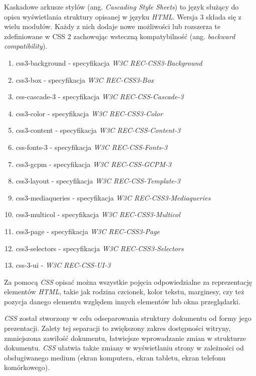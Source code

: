 \documentclass[polish, twoside, 12pt]{mwart}
\begin{document}
Kaskadowe arkusze stylów (ang. \emph{Cascading Style Sheets}) to język służący do opisu wyświetlania struktury opisanej w języku \emph{HTML}. Wersja 3 składa się z wielu modułów. Każdy z nich dodaje nowe możliwości lub rozszerza te zdefiniowane w CSS 2 zachowując wsteczną kompatybilność (ang. \emph{backward compatibility}).

\begin{enumerate}
  \item css3-background - specyfikacja \emph{W3C REC-CSS3-Background} \cite{w3c-rec-css3-background}
  \item css3-box - specyfikacja \emph{W3C REC-CSS3-Box} \cite{w3c-rec-css3-box}
  \item css-cascade-3 - specyfikacja \emph{W3C REC-CSS-Cascade-3} \cite{w3c-rec-css3-cascade}
  \item css3-color - specyfikacja \emph{W3C REC-CSS3-Color} \cite{w3c-rec-css3-color}
  \item css3-content - specyfikacja \emph{W3C REC-CSS-Content-3} \cite{w3c-rec-css3-content}
  \item css-fonts-3 - specyfikacja \emph{W3C REC-CSS-Fonts-3} \cite{w3c-rec-css3-fonts}
  \item css3-gcpm - specyfikacja \emph{W3C REC-CSS-GCPM-3} \cite{w3c-rec-css3-gcpm}
  \item css3-layout - specyfikacja \emph{W3C REC-CSS-Template-3} \cite{w3c-rec-css3-template}
  \item css3-mediaqueries - specyfikacja \emph{W3C REC-CSS3-Mediaqueries} \cite{w3c-rec-css3-mediaqueries}
  \item css3-multicol - specyfikacja \emph{W3C REC-CSS3-Multicol} \cite{w3c-rec-css3-multicol}
  \item css3-page - specyfikacja \emph{W3C REC-CSS3-Page} \cite{w3c-rec-css3-page}
  \item css3-selectors - specyfikacja \emph{W3C REC-CSS3-Selectors} \cite{w3c-rec-css3-selectors}
  \item css-3-ui - \emph{W3C REC-CSS-UI-3} \cite{w3c-rec-css3-ui}
\end{enumerate}

Za pomocą \emph{CSS} opisać można wszystkie pojęcia odpowiedzialne za reprezentację elementów \emph{HTML}, takie jak rodzina czcionek, kolor tekstu, marginesy, czy też pozycja danego elementu względem innych elementów lub okna przeglądarki.

\emph{CSS} został stworzony w celu odseparowania struktury dokumentu od formy jego prezentacji. Zalety tej separacji to zwiększony zakres dostępności witryny, zmniejszona zawiłość dokumentu, łatwiejsze wprowadzanie zmian w strukturze dokumentu. \emph{CSS} ułatwia także zmiany w wyświetlaniu strony w zależności od obsługiwanego medium (ekran komputera, ekran tabletu, ekran telefonu komórkowego).
\end{document}
